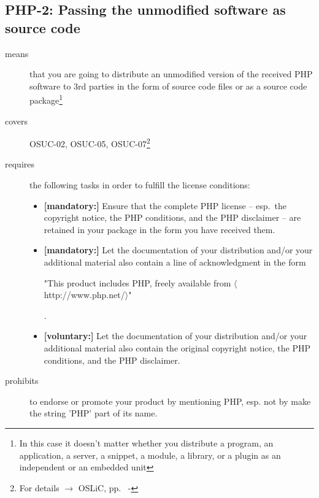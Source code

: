 \subsection{PHP-2: Passing the unmodified software as source code}
\label{OSUC-02-PHP} \label{OSUC-05-PHP} \label{OSUC-07-PHP} 

\begin{description}
\item[means] that you are going to distribute an unmodified version of the
received PHP software to 3rd parties in the form of source code files or as a
source code package\footnote{In this case it doesn't matter whether you 
distribute a program, an application, a server, a snippet, a module, a library,
or a plugin as an independent or an embedded unit}

\item[covers] OSUC-02, OSUC-05, OSUC-07\footnote{For details $\rightarrow$ OSLiC, pp.\ 
\pageref{OSUC-02-DEF} - \pageref{OSUC-07-DEF}}

\item[requires] the following tasks in order to fulfill the license conditions:
\begin{itemize}
  
  \item \textbf{[mandatory:]} Ensure that the complete PHP license -- esp.\
  the copyright notice, the PHP conditions, and the PHP disclaimer -- are
  retained in your package in the form you have received them.
  
  \item \textbf{[mandatory:]} Let the documentation of your distribution and/or
  your additional material also contain a line of acknowledgment in the form
  \begin{footnotesize}"This product includes PHP, freely available from
  $\langle$http://www.php.net/$\rangle$"\end{footnotesize}.
  
  \item \textbf{[voluntary:]} Let the documentation of your distribution and/or
  your additional material also contain the original copyright notice, the PHP
  conditions, and the PHP disclaimer.
  
\end{itemize}

\item[prohibits] to endorse or promote your product by mentioning PHP, esp. not
by make the string 'PHP' part of its name.

\end{description}


